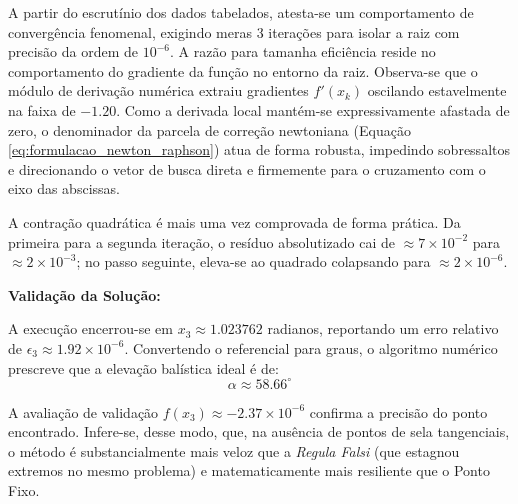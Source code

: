 A partir do escrutínio dos dados tabelados, atesta-se um comportamento de convergência fenomenal, exigindo meras 3 iterações para isolar a raiz com precisão da ordem de $10^{-6}$. A razão para tamanha eficiência reside no comportamento do gradiente da função no entorno da raiz. Observa-se que o módulo de derivação numérica extraiu gradientes $f'(x_k)$ oscilando estavelmente na faixa de $-1.20$. Como a derivada local mantém-se expressivamente afastada de zero, o denominador da parcela de correção newtoniana (Equação \ref{eq:formulacao_newton_raphson}) atua de forma robusta, impedindo sobressaltos e direcionando o vetor de busca direta e firmemente para o cruzamento com o eixo das abscissas.

A contração quadrática é mais uma vez comprovada de forma prática. Da primeira para a segunda iteração, o resíduo absolutizado cai de $\approx 7 \times 10^{-2}$ para $\approx 2 \times 10^{-3}$; no passo seguinte, eleva-se ao quadrado colapsando para $\approx 2 \times 10^{-6}$.

\textbf{Validação da Solução:}

A execução encerrou-se em $x_3 \approx 1.023762$ radianos, reportando um erro relativo de $\epsilon_3 \approx 1.92 \times 10^{-6}$. Convertendo o referencial para graus, o algoritmo numérico prescreve que a elevação balística ideal é de:
\begin{equation}
    \alpha \approx 58.66^\circ
\end{equation}

A avaliação de validação $f(x_3) \approx -2.37 \times 10^{-6}$ confirma a precisão do ponto encontrado. Infere-se, desse modo, que, na ausência de pontos de sela tangenciais, o método é substancialmente mais veloz que a \textit{Regula Falsi} (que estagnou extremos no mesmo problema) e matematicamente mais resiliente que o Ponto Fixo.

